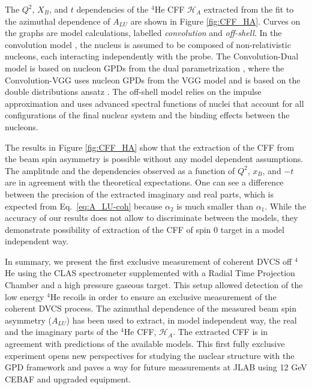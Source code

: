 \documentclass[twocolumn,nofootinbib,showpacs,prl,superscriptaddress,secnumarabic,amssymb,nobibnotes,aps,floatfix]{revtex4}
\begin{document}
The $Q^2$, $X_B$, and $t$ dependencies of the $^4$He CFF $\mathcal{H}_A$ 
extracted from the fit to the azimuthal dependence of $A_{LU}$ are shown in 
Figure \ref{fig:CFF_HA}. Curves on the graphs are model calculations, labelled 
{\it convolution} and {\it off-shell}. In the convolution model 
\cite{Vadim_priv}, the nucleus is assumed to be composed of non-relativistic 
nucleons, each interacting independently with 
the probe. The Convolution-Dual model is based on nucleon GPDs from the dual 
parametrization \cite{Guzey:2006xi}, where the Convolution-VGG uses nucleon 
GPDs  from the VGG model and is based on the double distributions ansatz 
\cite{DD_model}. The off-shell model \cite{GonzalezHernandez:2012jv} relies on 
the impulse approximation and uses advanced spectral functions of  nuclei that 
account for all configurations of the final nuclear system and the binding 
effects between the nucleons.

The results in Figure \ref{fig:CFF_HA} show that the extraction of the CFF
from the beam spin asymmetry is possible without any model dependent 
assumptions. The amplitude and the dependencies observed as a function of 
$Q^{2}$, $x_B$, and $-t$ are in agreement 
with the theoretical expectations. One can see a difference between the 
precision of the extracted imaginary and real parts, which is expected from
Eq.~\ref{eq:A_LU-coh} because $\alpha_2$ is much smaller than $\alpha_1$. While the 
accuracy of our results does not allow to discriminate between the models, they 
demonstrate possibility of extraction of the CFF of spin 0 target in a model 
independent way.


In summary, we present the first exclusive measurement of coherent DVCS off 
$^4$He using the CLAS spectrometer supplemented with a Radial Time Projection 
Chamber and a high pressure gaseous target. This setup allowed detection of the 
low energy $^4$He recoils in order to ensure an exclusive measurement of the
coherent DVCS process.
The azimuthal dependence of the measured beam spin asymmetry ($A_{LU}$) has 
been used to extract, in model independent way, the real and the imaginary 
parts of the $^4$He CFF, $\mathcal{H}_A$. The extracted CFF is in  
agreement with predictions of the available models. This first fully exclusive 
experiment opens new perspectives for studying the nuclear structure with the 
GPD framework and paves a way for future measurements at JLAB using 12 GeV 
CEBAF and upgraded equipment.

\end{document}
